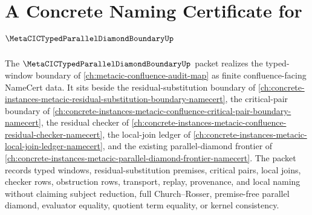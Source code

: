 \chapter{A Concrete Naming Certificate for $\MetaCICTypedParallelDiamondBoundaryUp$}
\label{ch:concrete-instances-metacic-typed-parallel-diamond-boundary-namecert}

The $\MetaCICTypedParallelDiamondBoundaryUp$ packet realizes the typed-window boundary of \autoref{ch:metacic-confluence-audit-map} as finite confluence-facing NameCert data. It sits beside the residual-substitution boundary of \autoref{ch:concrete-instances-metacic-residual-substitution-boundary-namecert}, the critical-pair boundary of \autoref{ch:concrete-instances-metacic-confluence-critical-pair-boundary-namecert}, the residual checker of \autoref{ch:concrete-instances-metacic-confluence-residual-checker-namecert}, the local-join ledger of \autoref{ch:concrete-instances-metacic-local-join-ledger-namecert}, and the existing parallel-diamond frontier of \autoref{ch:concrete-instances-metacic-parallel-diamond-frontier-namecert}. The packet records typed windows, residual-substitution premises, critical pairs, local joins, checker rows, obstruction rows, transport, replay, provenance, and local naming without claiming subject reduction, full Church--Rosser, premise-free parallel diamond, evaluator equality, quotient term equality, or kernel consistency.

